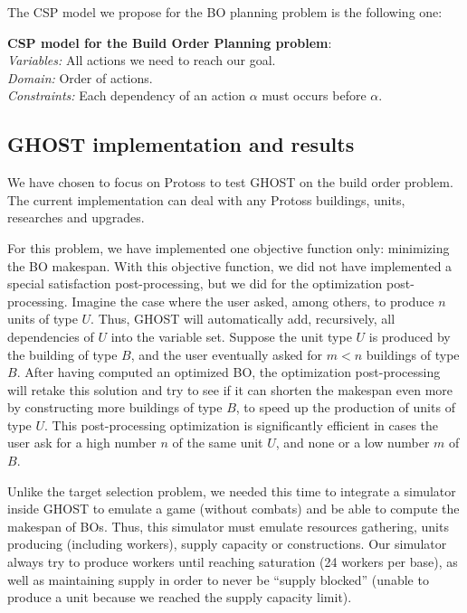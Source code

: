 \documentclass[journal]{IEEEtran}
\newcommand{\csp}{\textsc{CSP}\xspace}
\newcommand{\ghost}{\textsc{GHOST}\xspace}
\newcommand{\modelcsp}[4]%
{ \begin{trivlist}
  \item[]%
    \textbf{CSP model for #1}:\\
    \textit{Variables:} #2\\
    \textit{Domain:} #3\\
    \textit{Constraints:} #4
  \end{trivlist}%
}
\begin{document}
The \csp model we propose for  the BO planning problem is the
following one:
\modelcsp{the Build Order Planning problem}%
{All actions we need to reach our goal.}%
{Order of actions.}%
{Each dependency of an action $\alpha$ must occurs before $\alpha$.}

\subsection{\ghost implementation and results}

We have chosen to  focus on Protoss to test \ghost  on the build order
problem.   The  current  implementation  can  deal  with  any  Protoss
buildings, units, researches and upgrades.

For this  problem, we  have implemented  one objective  function only:
minimizing the BO makespan.  With  this objective function, we did not
have implemented  a special  satisfaction post-processing, but  we did
for the optimization post-processing. Imagine  the case where the user
asked, among  others, to produce $n$  units of type $U$.  Thus, \ghost
will automatically add, recursively, all  dependencies of $U$ into the
variable set.  Suppose  the unit type $U$ is produced  by the building
of type $B$,  and the user eventually  asked for $m <  n$ buildings of
type $B$.   After having  computed an  optimized BO,  the optimization
post-processing will  retake this solution  and try  to see if  it can
shorten the makespan even more  by constructing more buildings of type
$B$,  to  speed  up  the  production  of  units  of  type  $U$.   This
post-processing optimization  is significantly efficient in  cases the
user ask for a high number $n$ of the same unit $U$, and none or a low
number $m$ of $B$.

Unlike the target selection problem,  we needed this time to integrate
a simulator inside  \ghost to emulate a game (without  combats) and be
able to  compute the  makespan of BOs. Thus,  this simulator
must emulate resources gathering, units producing (including workers),
supply capacity or constructions.  Our simulator always try to
produce workers  until reaching saturation  (24 workers per  base), as
well as  maintaining supply in  order to never be  ``supply blocked'' (unable  to  produce a  unit because  we  reached the  supply
capacity limit).
\end{document}

